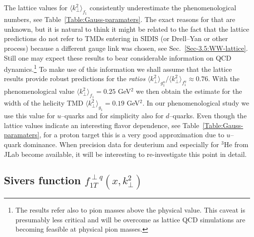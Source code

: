 \documentclass[a4paper,11pt]{article}
\def\kperp{k_\perp}
\begin{document}
The lattice values for $\langle \kperp^2 \rangle_{f_1}$ consistently
underestimate the phenomenological numbers, see
Table~\ref{Table:Gauss-paramaters}.
The exact reasons for that are unknown, but it is natural to think it
might be related to the fact that the lattice predictions \cite{Hagler:2009mb}
do not refer to TMDs entering in SIDIS (or Drell--Yan or other process)
because a different gauge link was chosen, see Sec.~\ref{Sec-3.5:WW-lattice}.
Still one may expect these results to bear considerable information
on QCD dynamics.\footnote{
	The results \cite{Hagler:2009mb} refer also to pion masses above the
	physical value. This caveat is presumably less critical and
	will be overcome as lattice QCD simulations are becoming feasible
	at physical pion masses.}
To make use of this information we shall assume that the lattice results
\cite{Hagler:2009mb} provide robust predictions for the {\it ratios}
$\langle \kperp^2 \rangle_{g_1^u}/\langle \kperp^2 \rangle_{f_1^u}\approx 0.76$.
With the phenomenological value $\langle \kperp^2 \rangle_{f_1} = 0.25$ GeV$^2$
we then obtain the estimate for the width of the helicity TMD
$\langle \kperp^2 \rangle_{g_1} = 0.19$ GeV$^2$.
In our phenomenological study we use this value for $u$--quarks and for
simplicity also for $d$--quarks. Even though the lattice values indicate
an interesting flavor dependence, see Table~\ref{Table:Gauss-paramaters},
for a proton target this is a very good approximation due to $u$--quark
dominance. When precision data for deuterium and especially for $^3$He
from JLab become available, it will be interesting to
re-investigate this point in detail.

\subsection{\boldmath Sivers function $f_{1T}^{\perp q}(x,k_\perp^{2})$}
\label{App:basis-f1Tperp}
\end{document}
